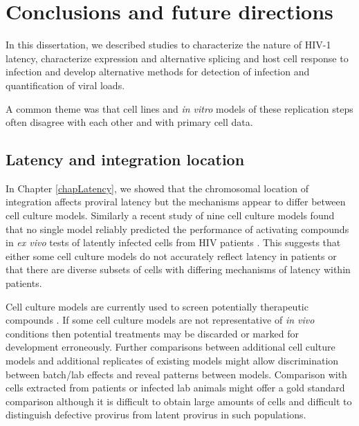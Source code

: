 \documentclass[../sherrill-Mix_thesis.tex]{subfiles}
\begin{document}
\chapter{Conclusions and future directions}
\graphicspath{{im/}{conclusion/im/}}

In this dissertation, we described studies to characterize the nature of HIV-1 latency, characterize expression and alternative splicing and host cell response to infection and develop alternative methods for detection of infection and quantification of viral loads.

A common theme was that cell lines and \textit{in vitro} models of these replication steps often disagree with each other and with primary cell data. 

\section{Latency and integration location}

	In Chapter \ref{chapLatency}, we showed that the chromosomal location of integration affects proviral latency but the mechanisms appear to differ between cell culture models. Similarly a recent study of nine cell culture models found that no single model reliably predicted the performance of activating compounds in \textit{ex vivo} tests of latently infected cells from HIV patients \citep{Spina2013}. This suggests that either some cell culture models do not accurately reflect latency in patients or that there are diverse subsets of cells with differing mechanisms of latency within patients. 

	Cell culture models are currently used to screen potentially therapeutic compounds \citep{Xing2011,Spina2013}. If some cell culture models are not representative of \textit{in vivo} conditions then potential treatments may be discarded or marked for development erroneously. Further comparisons between additional cell culture models and additional replicates of existing models might allow discrimination between batch/lab effects and reveal patterns between models. Comparison with cells extracted from patients or infected lab animals might offer a gold standard comparison although it is difficult to obtain large amounts of cells and difficult to distinguish defective provirus from latent provirus in such populations. %
\end{document}
